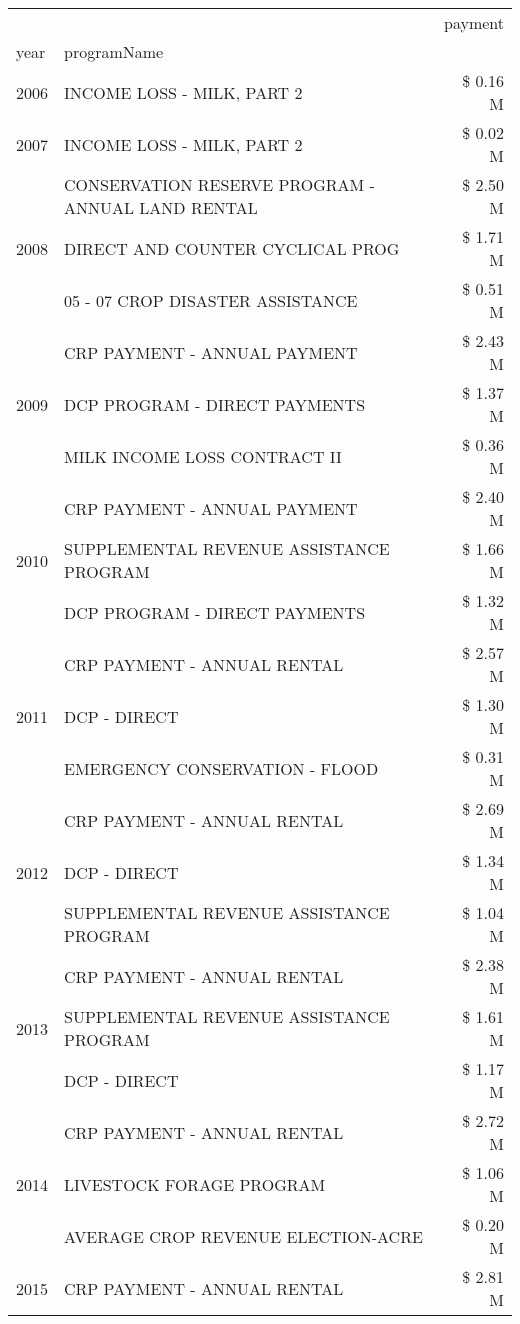 \begin{tabular}{llr}
\toprule
 &  & payment \\
year & programName &  \\
\midrule
2006 & INCOME LOSS - MILK, PART 2 & \$ 0.16 M \\
\cline{1-3}
2007 & INCOME LOSS - MILK, PART 2 & \$ 0.02 M \\
\cline{1-3}
\multirow[t]{3}{*}{2008} & CONSERVATION RESERVE PROGRAM - ANNUAL LAND RENTAL & \$ 2.50 M \\
 & DIRECT AND COUNTER CYCLICAL PROG & \$ 1.71 M \\
 & 05 - 07 CROP DISASTER ASSISTANCE & \$ 0.51 M \\
\cline{1-3}
\multirow[t]{3}{*}{2009} & CRP PAYMENT - ANNUAL PAYMENT & \$ 2.43 M \\
 & DCP PROGRAM - DIRECT PAYMENTS & \$ 1.37 M \\
 & MILK INCOME LOSS CONTRACT II & \$ 0.36 M \\
\cline{1-3}
\multirow[t]{3}{*}{2010} & CRP PAYMENT - ANNUAL PAYMENT & \$ 2.40 M \\
 & SUPPLEMENTAL REVENUE ASSISTANCE PROGRAM & \$ 1.66 M \\
 & DCP PROGRAM - DIRECT PAYMENTS & \$ 1.32 M \\
\cline{1-3}
\multirow[t]{3}{*}{2011} & CRP PAYMENT - ANNUAL RENTAL & \$ 2.57 M \\
 & DCP - DIRECT & \$ 1.30 M \\
 & EMERGENCY CONSERVATION - FLOOD & \$ 0.31 M \\
\cline{1-3}
\multirow[t]{3}{*}{2012} & CRP PAYMENT - ANNUAL RENTAL & \$ 2.69 M \\
 & DCP - DIRECT & \$ 1.34 M \\
 & SUPPLEMENTAL REVENUE ASSISTANCE PROGRAM & \$ 1.04 M \\
\cline{1-3}
\multirow[t]{3}{*}{2013} & CRP PAYMENT - ANNUAL RENTAL & \$ 2.38 M \\
 & SUPPLEMENTAL REVENUE ASSISTANCE PROGRAM & \$ 1.61 M \\
 & DCP - DIRECT & \$ 1.17 M \\
\cline{1-3}
\multirow[t]{3}{*}{2014} & CRP PAYMENT - ANNUAL RENTAL & \$ 2.72 M \\
 & LIVESTOCK FORAGE PROGRAM & \$ 1.06 M \\
 & AVERAGE CROP REVENUE ELECTION-ACRE & \$ 0.20 M \\
\cline{1-3}
\multirow[t]{3}{*}{2015} & CRP PAYMENT - ANNUAL RENTAL & \$ 2.81 M \\

\end{tabular}
